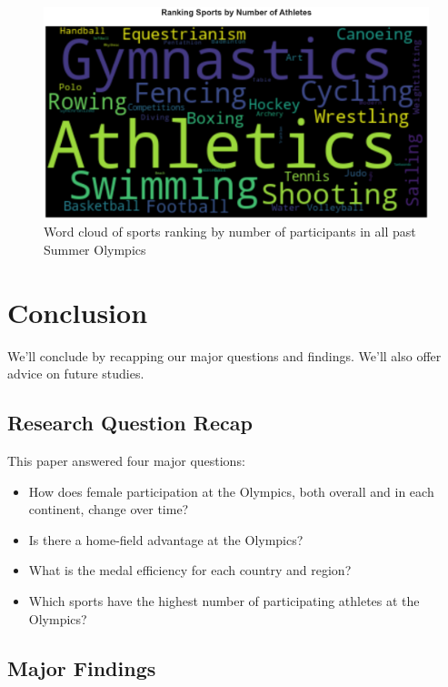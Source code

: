 \documentclass[
]{article}
\providecommand{\tightlist}{%
  \setlength{\itemsep}{0pt}\setlength{\parskip}{0pt}}
\begin{document}
\begin{figure}

{\centering \includegraphics[width=1\linewidth]{static/pics/g-4-2} 

}

\caption{Word cloud of sports ranking by number of participants in all past Summer Olympics}\label{fig:figure34}
\end{figure}

\hypertarget{conclusion}{%
\section{Conclusion}\label{conclusion}}

We'll conclude by recapping our major questions and findings. We'll also offer advice on future studies.

\hypertarget{conclusion-rq-recap}{%
\subsection{Research Question Recap}\label{conclusion-rq-recap}}

This paper answered four major questions:

\begin{itemize}
\tightlist
\item
  How does female participation at the Olympics, both overall and in each continent, change over time?
\item
  Is there a home-field advantage at the Olympics?
\item
  What is the medal efficiency for each country and region?
\item
  Which sports have the highest number of participating athletes at the Olympics?
\end{itemize}

\hypertarget{conclusion-findings}{%
\subsection{Major Findings}\label{conclusion-findings}}
\end{document}
